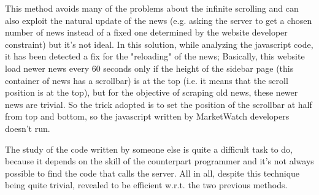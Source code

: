 This method avoids many of the problems about the infinite scrolling and can also exploit the natural update of the news (e.g. asking the server to get a chosen number of news instead of a fixed one determined by the website developer constraint) but it's not ideal. 
In this solution, while analyzing the javascript code, it has been detected a fix for the "reloading" of the news; Basically, this website load newer news every 60 seconds only if the height of the sidebar page (this container of news has a scrollbar) is at the top (i.e. it means that the scroll position is at the top), but for the objective of scraping old news, these newer news are trivial. So the trick adopted is to set the position of the scrollbar at half from top and bottom, so the javascript written by MarketWatch developers doesn't run.
\par
The study of the code written by someone else is quite a difficult task to do, because it depends on the skill of the counterpart programmer and it's not always possible to find the code that calls the server. All in all, despite this technique being quite trivial, revealed to be efficient w.r.t. the two previous methods.
\par
